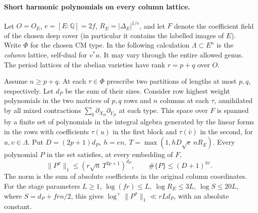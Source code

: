 \paragraph{Short harmonic polynomials on every column lattice.}
Let \(O=O_E\), \(e=[E:\mathbb Q]=2f\), \(R_E=|\Delta_E|^{1/e}\),
and let \(F\) denote the coefficient field of the chosen deep
cover (in particular it contains the labelled images of \(E\)).
Write \(\Phi\) for the chosen CM type. In the following calculation
\(\Lambda\subset E^n\) is the \emph{column} lattice, self-dual for
\(v^*u\). It may vary through the entire allowed genus. The period
lattices of the abelian varieties have rank \(r=p+q\) over \(O\).

\begin{proposition}
\label{bfam:harm}
Assume \(n\ge p+q\). At each \(\tau\in\Phi\) prescribe two
partitions of lengths at most \(p,q\), respectively. Let \(d_P\)
be the sum of their sizes. Consider row highest weight polynomials
in the two matrices of \(p,q\) rows and \(n\) columns at each
\(\tau\), annihilated by all mixed contractions
\(\sum_b\partial_{X_{ib}}\partial_{Y_{jb}}\) at each type.
This space over \(F\) is spanned by a finite set of polynomials
in the integral algebra generated by the linear forms in the rows
with coefficients \(\tau(u)\) in the first block and
\(\tau(\bar v)\) in the second, for \(u,v\in\Lambda\).
Put \(D=(2p+1)d_P,\ h=en,\ T=\max(1,hD\sqrt e\,nR_E)\). Every
polynomial \(P\) in the set satisfies, at every embedding of \(F\),
\[
       \|P^\sigma\|_1\le (r\sqrt n\,T^{2p+1})^{d_P},
 \qquad \#\{P\}\le (D+1)^{hr}.
\]
The norm is the sum of absolute coefficients in the original
column coordinates. For the stage parameters \(L\ge1\),
\(\log(fr)\le L,\ \log R_E\le3L,\ \log S\le20L\), where
\(S=d_P+frn/2\), this gives
\(\log^+\|P^\sigma\|_1\ll rL d_P\), with an absolute constant.
\end{proposition}

